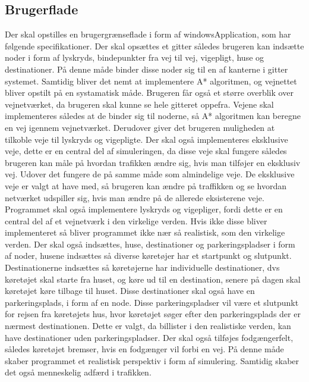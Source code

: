 \vspace{5mm}

\subsection{Brugerflade}
Der skal opstilles en brugergrænseflade i form af windowsApplication, som har følgende specifikationer. Der skal opsættes et gitter således brugeren kan indsætte noder i form af lyskryds, bindepunkter fra vej til vej, vigepligt, huse og destinationer. På denne måde binder disse noder sig til en af kanterne i gitter systemet. Samtidig bliver det nemt at implementere A* algoritmen, og vejnettet bliver opstilt på en systamatisk måde. Brugeren får også et større overblik over vejnetværket, da brugeren skal kunne se hele gitteret oppefra. Vejene skal implementeres således at de binder sig til noderne, så A* algoritmen kan beregne en vej igennem vejnetværket. Derudover giver det brugeren muligheden at tilkoble veje til lyskryds og vigepligte. Der skal også implementeres eksklusive veje, dette er en central del af simuleringen, da disse veje skal fungere således brugeren kan måle på hvordan trafikken ændre sig, hvis man tilføjer en eksklusiv vej. Udover det fungere de på samme måde som almindelige veje. De eksklusive veje er valgt at have med, så brugeren kan ændre på traffikken og se hvordan netværket udspiller sig, hvis man ændre på de allerede eksisterene veje. Programmet skal også implementere lyskryds og vigepliger, fordi dette er en central del af et vejnetværk i den virkelige verden. Hvis ikke disse bliver implementeret så bliver programmet ikke nær så realistisk, som den virkelige verden. Der skal også indsættes, huse, destinationer og parkeringspladser i form af noder, husene indsættes så diverse køretøjer har et startpunkt og slutpunkt. Destinationerne indsættes så køretøjerne har individuelle destinationer, dvs køretøjet skal starte fra huset, og køre ud til en destination, senere på dagen skal køretøjet køre tilbage til huset. Disse destinationer skal også have en parkeringsplads, i form af en node. Disse parkeringspladser vil være et slutpunkt for rejsen fra køretøjets hus, hvor køretøjet søger efter den parkeringsplads der er nærmest destinationen. Dette er valgt, da billister i den realistiske verden, kan have destinationer uden parkeringspladser. Der skal også tilføjes fodgængerfelt, således køretøjet bremser, hvis en fodgænger vil forbi en vej. På denne måde skaber programmet et realistisk perspektiv i form af simulering. Samtidig skaber det også menneskelig adfærd i trafikken.


